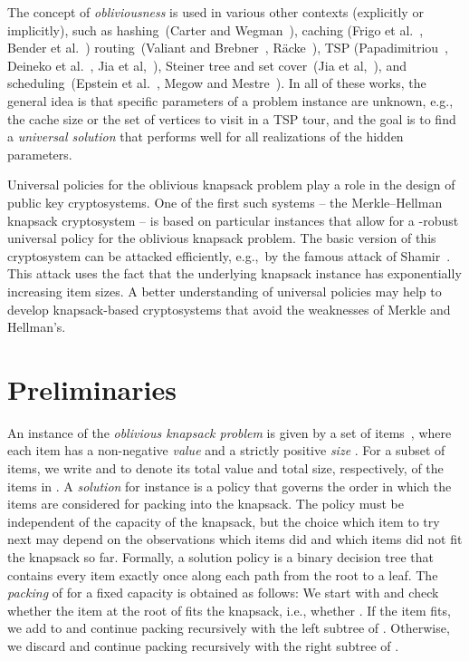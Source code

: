\documentclass[11pt]{article}
\begin{document}
The concept of \emph{obliviousness }is used in various other contexts
(explicitly or implicitly), such as hashing~(Carter and Wegman~\cite{carterW79}),
caching (Frigo et al.~\cite{frigoLPR99}, Bender et al.~\cite{benderCD02})
routing~(Valiant and Brebner~\cite{valiantB81}, Räcke~\cite{raecke09}),
TSP (Papadimitriou~\cite{papadimitriou94}, Deineko et al.~\cite{deinekoRW95},
Jia et al,~\cite{jiaLNRS05}), Steiner tree and set cover~(Jia et
al,~\cite{jiaLNRS05}), and scheduling~(Epstein et al.~\cite{epsteinLMMMSS12},
Megow and Mestre~\cite{megowM13}). In all of these works, the general
idea is that specific parameters of a problem instance are unknown,
e.g., the cache size or the set of vertices to visit in a TSP tour,
and the goal is to find a \emph{universal solution }that performs
well for all realizations of the hidden parameters.

Universal policies for the oblivious knapsack problem play a role
in the design of public key cryptosystems. One of the first such systems
-- the Merkle–Hellman knapsack cryptosystem \cite{merkleH78} -- is
based on particular instances that allow for a -robust universal
policy for the oblivious knapsack problem. The basic version of this
cryptosystem can be attacked efficiently, e.g.,~by the famous attack
of Shamir~\cite{shamir82}. This attack uses the fact that the underlying
knapsack instance has exponentially increasing item sizes. A better
understanding of universal policies may help to develop knapsack-based
cryptosystems that avoid the weaknesses of Merkle and Hellman's.


\section{Preliminaries}

An instance of the \emph{oblivious knapsack problem} is given by a
set of  items~, where each item 
has a non-negative \emph{value}  and a
strictly positive \emph{size} . For a subset
 of items, we write  and 
to denote its total value and total size, respectively, of the items
in . A \emph{solution} for instance  is a policy
 that governs the order in which the items are considered
for packing into the knapsack. The policy must be independent of the
capacity of the knapsack, but the choice which item to try next may
depend on the observations which items did and which items did not
fit the knapsack so far. Formally, a solution policy is a binary decision
tree that contains every item exactly once along each path from the
root to a leaf. The \emph{packing}  of
 for a fixed capacity  is obtained as follows: We
start with  and check whether the item
 at the root of  fits the knapsack, i.e., whether
. If the item fits, we add  to
 and continue packing recursively with the left
subtree of . Otherwise, we discard  and continue packing recursively
with the right subtree of .
\end{document}
